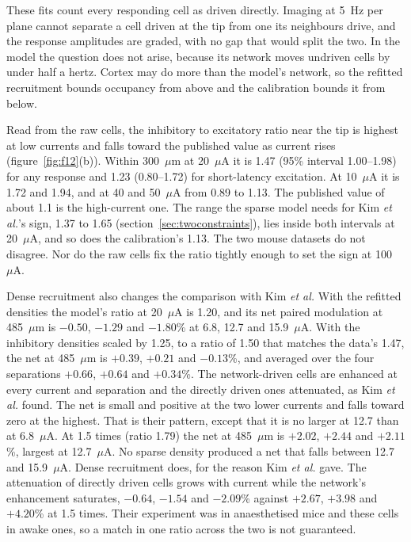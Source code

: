 \documentclass[10pt,twocolumn]{article}
\newcommand{\um}{\ensuremath{\mu\text{m}}}
\newcommand{\uA}{\ensuremath{\mu\text{A}}}
\begin{document}
These fits count every responding cell as driven directly. Imaging at
5~Hz per plane cannot separate a cell driven at the tip from one its
neighbours drive, and the response amplitudes are graded, with no gap that
would split the two. In the model the question does not arise, because
its network moves undriven cells by under half a hertz. Cortex may do
more than the model's network, so the refitted recruitment bounds
occupancy from above and the calibration bounds it from below.

Read from the raw cells, the inhibitory to excitatory ratio near the tip
is highest at low currents and falls toward the published value as
current rises (figure~\ref{fig:f12}(b)). Within 300~\um{} at 20~\uA{} it
is 1.47 (95\% interval 1.00--1.98) for any response and 1.23
(0.80--1.72) for short-latency excitation. At 10~\uA{} it is 1.72 and
1.94, and at 40 and 50~\uA{} from 0.89 to 1.13. The published value of
about 1.1 is the high-current one. The range the sparse model needs for
Kim \textit{et al.}'s sign, 1.37 to 1.65 (section~\ref{sec:twoconstraints}),
lies inside both intervals at 20~\uA, and so does the calibration's
1.13. The two mouse datasets do not disagree. Nor do the raw cells fix the
ratio tightly enough to set the sign at 100~\uA.

Dense recruitment also changes the comparison with Kim \textit{et al.}
With the refitted densities the model's ratio at 20~\uA{} is 1.20, and its
net paired modulation at 485~\um{} is $-0.50$, $-1.29$ and $-1.80$\% at
6.8, 12.7 and 15.9~\uA. With the inhibitory densities scaled by 1.25, to
a ratio of 1.50 that matches the data's 1.47, the net at 485~\um{} is
$+0.39$, $+0.21$ and $-0.13$\%, and averaged over the four separations
$+0.66$, $+0.64$ and $+0.34$\%. The network-driven cells are enhanced at
every current and separation and the directly driven ones attenuated, as
Kim \textit{et al.} found. The net is small and positive at the two lower
currents and falls toward zero at the highest. That is their pattern,
except that it is no larger at 12.7 than at 6.8~\uA. At 1.5 times (ratio
1.79) the net at 485~\um{} is $+2.02$, $+2.44$ and $+2.11$\%, largest at
12.7~\uA. No sparse density produced a net that falls between 12.7 and
15.9~\uA. Dense recruitment does, for the reason Kim \textit{et al.}
gave. The attenuation of directly driven cells grows with current while
the network's enhancement saturates, $-0.64$, $-1.54$ and $-2.09$\%
against $+2.67$, $+3.98$ and $+4.20$\% at 1.5 times. Their experiment was in anaesthetised
mice and these cells in awake ones, so a match in one ratio across the
two is not guaranteed.
\end{document}
